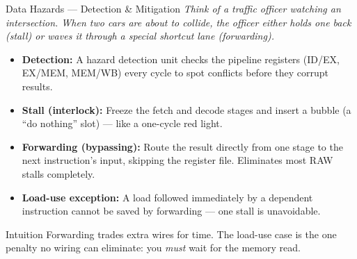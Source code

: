 \documentclass{beamer}
\begin{document}
\begin{frame}{Data Hazards --- Detection \& Mitigation}
  \textit{Think of a traffic officer watching an intersection. When two cars
  are about to collide, the officer either holds one back (stall) or waves it
  through a special shortcut lane (forwarding).}

  \smallskip
  \begin{itemize}
    \item \textbf{Detection:} A hazard detection unit checks the pipeline
          registers (ID/EX, EX/MEM, MEM/WB) every cycle to spot conflicts
          before they corrupt results.
    \item \textbf{Stall (interlock):} Freeze the fetch and decode stages and
          insert a bubble (a ``do nothing'' slot) --- like a one-cycle red light.
    \item \textbf{Forwarding (bypassing):} Route the result directly from one
          stage to the next instruction's input, skipping the register file.
          Eliminates most RAW stalls completely.
    \item \textbf{Load-use exception:} A load followed immediately by a
          dependent instruction cannot be saved by forwarding --- one stall is
          unavoidable.
  \end{itemize}

  \begin{block}{Intuition}
    \small Forwarding trades extra wires for time. The load-use case is the one
    penalty no wiring can eliminate: you \emph{must} wait for the memory read.
  \end{block}
\end{frame}
\end{document}
